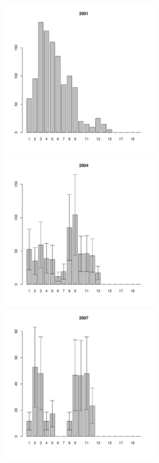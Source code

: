 \documentclass[12pt, a4paper]{article}
\begin{document}
\begin{figure}[h]

\begin{multicols}{3}
\hfill
\includegraphics[width=65mm]{../White_Sea/Luvenga_Goreliy/midlow_2001_.pdf}
\hfill
\includegraphics[width=65mm]{../White_Sea/Luvenga_Goreliy/midlow_2004_.pdf}
\hfill
\includegraphics[width=65mm]{../White_Sea/Luvenga_Goreliy/midlow_2007_.pdf}
\end{multicols}


\end{figure}
\end{document}
